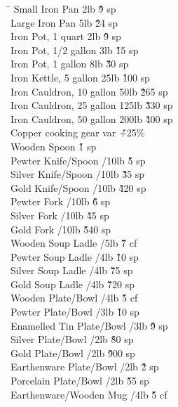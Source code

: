 \begin{multicols}{3}
{\begin{tabbing}
\hspace{0.8\linewidth}\= \kill
Small Iron Pan				\> 2lb			\' \` 9 sp \\
Large Iron Pan				\> 5lb			\' \` 24 sp \\
Iron Pot, 1 quart			\> 2lb			\' \` 9 sp \\
Iron Pot, 1/2 gallon			\> 3lb			\' \` 15 sp \\
Iron Pot, 1 gallon			\> 8lb			\' \` 30 sp \\
Iron Kettle, 5 gallon			\> 25lb			\' \` 100 sp \\
Iron Cauldron, 10 gallon		\> 50lb			\' \` 265 sp \\
Iron Cauldron, 25 gallon		\> 125lb		\' \` 330 sp \\
Iron Cauldron, 50 gallon		\> 200lb		\' \` 400 sp \\
Copper cooking gear			\> var			\' \` +25\% \\
Wooden Spoon							\' \` 1 sp \\
Pewter Knife/Spoon			/10lb		\' \` 5 sp \\
Silver Knife/Spoon			/10lb		\' \` 35 sp \\
Gold Knife/Spoon			/10lb		\' \` 420 sp \\
Pewter Fork				/10lb		\' \` 6 sp \\
Silver Fork				/10lb		\' \` 45 sp \\
Gold Fork				/10lb		\' \` 540 sp \\
Wooden Soup Ladle			/5lb		\' \` 7 cf \\
Pewter Soup Ladle			/4lb		\' \` 10 sp \\
Silver Soup Ladle			/4lb		\' \` 75 sp \\
Gold Soup Ladle				/4lb		\' \` 720 sp \\
Wooden Plate/Bowl			/4lb		\' \` 5 cf \\
Pewter Plate/Bowl			/3lb		\' \` 10 sp \\
Enamelled Tin Plate/Bowl		/3lb		\' \` 9 sp \\
Silver Plate/Bowl			/2lb		\' \` 80 sp \\
Gold Plate/Bowl				/2lb		\' \` 900 sp \\
Earthenware Plate/Bowl			/2lb		\' \` 2 sp \\
Porcelain Plate/Bowl			/2lb		\' \` 55 sp \\
Earthenware/Wooden Mug			/4lb		\' \` 5 cf \\

\end{tabbing}}
\end{multicols}
